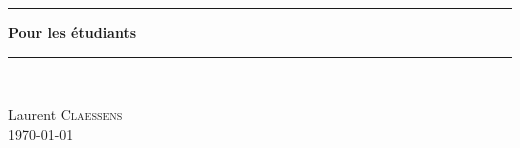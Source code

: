 
\thispagestyle{empty}
\begin{center}
	\begin{minipage}{15cm}
		\hrule\par
		\vspace{2mm}
		\begin{center}
			\Huge \bfseries  Pour les étudiants \par
		\end{center}
		\hrule\par
	\end{minipage}\\
\end{center}

\vspace{2cm}

\begin{center}
	Laurent \textsc{Claessens}\\
	\today
\end{center}

\vfill

\LogoEtLicence

\clearpage

\thispagestyle{empty}

